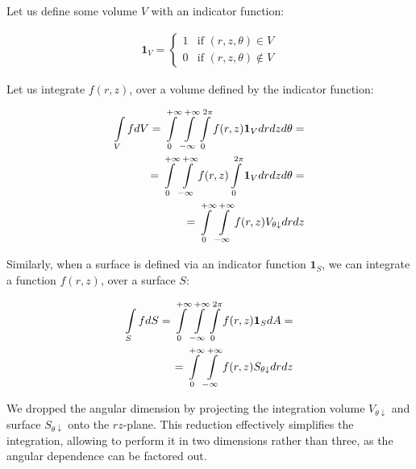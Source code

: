 \documentclass[10pt, a4paper]{article}
\begin{document}
\begin{multicols}{2}
Let us define some volume $V$ with an indicator function:

\begin{eqnarray}
    \bm{1}_V =
    \begin{cases}
        1 & \text{if } (r, z, \theta) \in V\\
        0 & \text{if } (r, z, \theta) \notin V
    \end{cases}
\end{eqnarray}

Let us integrate $f(r, z)$, over a volume defined by the indicator function:

\begin{eqnarray}
    \label{eq:int_indicator_V}
    \begin{split}
        \int\limits_{V} f dV
        =\int\displaylimits_{0}^{+\infty} \int\displaylimits_{-\infty}^{+\infty} \int\displaylimits_{0}^{2\pi} f(r, z) \bm{1}_V  dr dz d\theta =\\
        =\int\displaylimits_{0}^{+\infty} \int\displaylimits_{-\infty}^{+\infty} f(r, z) \int\displaylimits_{0}^{2\pi}  \bm{1}_V dr dz d\theta =\\
        =\int\displaylimits_{0}^{+\infty} \int\displaylimits_{-\infty}^{+\infty} f(r, z)  V_{\theta \downarrow} dr dz
    \end{split}
\end{eqnarray}

Similarly, when a surface is defined via an indicator function $\bm{1}_S$, we can integrate a function $f(r, z)$, over a surface $S$:

\begin{eqnarray}
    \label{eq:int_indicator_S}
    \begin{split}
        \int\limits_{S} f dS = \int\displaylimits_{0}^{+\infty} \int\displaylimits_{-\infty}^{+\infty} \int\displaylimits_{0}^{2\pi} f(r, z) \bm{1}_S  dA =\\
        =\int\displaylimits_{0}^{+\infty} \int\displaylimits_{-\infty}^{+\infty} f(r, z)  S_{\theta \downarrow} dr dz
    \end{split}
\end{eqnarray}

We dropped the angular dimension by projecting the integration volume $V_{\theta \downarrow}$ and surface $S_{\theta \downarrow}$ onto the $rz$-plane.
This reduction effectively simplifies the integration, allowing to perform it in two dimensions rather than three, as the angular dependence can be factored out.



\end{multicols}
\end{document}
